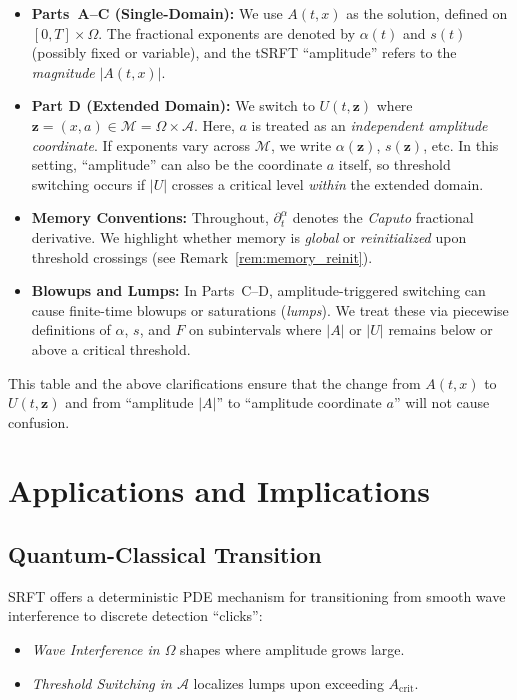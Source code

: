 \documentclass[12pt]{article}
\begin{document}
\begin{itemize}
\item \textbf{Parts~A--C (Single-Domain):} 
  We use $A(t,x)$ as the solution, defined on $[0,T]\times\Omega$. 
  The fractional exponents are denoted by $\alpha(t)$ and $s(t)$ (possibly fixed or variable), 
  and the tSRFT “amplitude” refers to the \emph{magnitude} $\lvert A(t,x)\rvert$.

\item \textbf{Part D (Extended Domain):} 
  We switch to $U(t,\mathbf{z})$ where $\mathbf{z}=(x,a)\in \mathcal{M}=\Omega\times\mathcal{A}$. 
  Here, $a$ is treated as an \emph{independent amplitude coordinate}. If exponents vary across 
  $\mathcal{M}$, we write $\alpha(\mathbf{z})$, $s(\mathbf{z})$, etc. 
  In this setting, “amplitude” can also be the coordinate $a$ itself, so threshold switching 
  occurs if $\lvert U\rvert$ crosses a critical level \emph{within} the extended domain.

\item \textbf{Memory Conventions:} 
  Throughout, $\partial_t^\alpha$ denotes the \emph{Caputo} fractional derivative. We highlight 
  whether memory is \emph{global} or \emph{reinitialized} upon threshold crossings 
  (see Remark~\ref{rem:memory_reinit}).

\item \textbf{Blowups and Lumps:} 
  In Parts~C--D, amplitude-triggered switching can cause finite-time blowups or saturations 
  (\emph{lumps}). We treat these via piecewise definitions of $\alpha$, $s$, and $F$ 
  on subintervals where $\lvert A\rvert$ or $\lvert U\rvert$ remains below or above a 
  critical threshold.
\end{itemize}

This table and the above clarifications ensure that the change from $A(t,x)$ to $U(t,\mathbf{z})$
and from “amplitude $|A|$” to “amplitude coordinate $a$” will not cause confusion.

\section{Applications and Implications}
\label{sec:applications}

\subsection{Quantum-Classical Transition}
SRFT offers a deterministic PDE mechanism for transitioning from smooth wave interference to discrete detection “clicks”:
\begin{itemize}
    \item \emph{Wave Interference in $\Omega$} shapes where amplitude grows large.
    \item \emph{Threshold Switching in $\mathcal{A}$} localizes lumps upon exceeding $A_{\mathrm{crit}}$.
\end{itemize}
\end{document}

